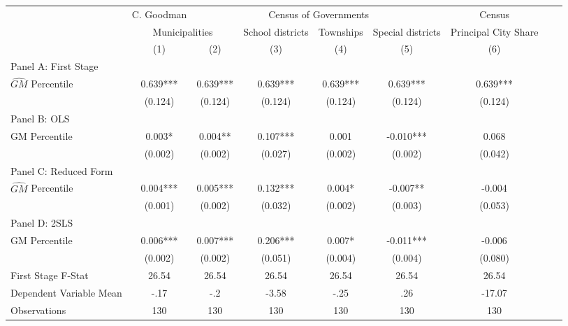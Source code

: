  \begin{tabular}{l*{8}{c}} \toprule
&\multicolumn{1}{c}{C. Goodman}&\multicolumn{4}{c}{Census of Governments}&\multicolumn{1}{c}{Census}\\\cmidrule(lr){2-2}\cmidrule(lr){3-6}\cmidrule(lr){7-7}
&\multicolumn{2}{c}{Municipalities}&\multicolumn{1}{c}{School districts}&\multicolumn{1}{c}{Townships}&\multicolumn{1}{c}{Special districts}&\multicolumn{1}{c}{Principal City Share}\\\cmidrule(lr){2-3}\cmidrule(lr){4-6}\cmidrule(lr){7-7}
&\multicolumn{1}{c}{(1)}&\multicolumn{1}{c}{(2)}&\multicolumn{1}{c}{(3)}&\multicolumn{1}{c}{(4)}&\multicolumn{1}{c}{(5)}&\multicolumn{1}{c}{(6)}\\
\cmidrule(lr){1-7}
\multicolumn{6}{l}{Panel A: First Stage}\\
\cmidrule(lr){1-7}
$\widehat{GM}$ Percentile&    0.639***&    0.639***&    0.639***&    0.639***&    0.639***&    0.639***\\
                &  (0.124)   &  (0.124)   &  (0.124)   &  (0.124)   &  (0.124)   &  (0.124)   \\
\cmidrule(lr){1-7}
\multicolumn{6}{l}{Panel B: OLS}\\
\cmidrule(lr){1-7}
GM Percentile   &    0.003*  &    0.004** &    0.107***&    0.001   &   -0.010***&    0.068   \\
                &  (0.002)   &  (0.002)   &  (0.027)   &  (0.002)   &  (0.002)   &  (0.042)   \\
\cmidrule(lr){1-7}
\multicolumn{6}{l}{Panel C: Reduced Form}\\
\cmidrule(lr){1-7}
$\widehat{GM}$ Percentile&    0.004***&    0.005***&    0.132***&    0.004*  &   -0.007** &   -0.004   \\
                &  (0.001)   &  (0.002)   &  (0.032)   &  (0.002)   &  (0.003)   &  (0.053)   \\
\cmidrule(lr){1-7}
\multicolumn{6}{l}{Panel D: 2SLS}\\
\cmidrule(lr){1-7}
GM Percentile   &    0.006***&    0.007***&    0.206***&    0.007*  &   -0.011***&   -0.006   \\
                &  (0.002)   &  (0.002)   &  (0.051)   &  (0.004)   &  (0.004)   &  (0.080)   \\
\midrule
First Stage F-Stat&    26.54   &    26.54   &    26.54   &    26.54   &    26.54   &    26.54   \\
Dependent Variable Mean&     -.17   &      -.2   &    -3.58   &     -.25   &      .26   &   -17.07   \\
Observations    &      130   &      130   &      130   &      130   &      130   &      130   \\
       \bottomrule \end{tabular}
